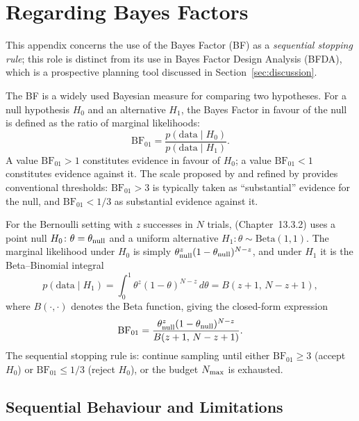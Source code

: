 \section{Regarding Bayes Factors}\label{app:app_bayes_factors}

This appendix concerns the use of the Bayes Factor (BF) as a \textit{sequential
stopping rule}; this role is distinct from its use in Bayes Factor Design Analysis
(BFDA), which is a prospective planning tool discussed in Section~\ref{sec:discussion}.

The BF is a widely used Bayesian measure for comparing two hypotheses.
For a null hypothesis $H_0$ and an alternative $H_1$, the Bayes Factor in favour of
the null is defined as the ratio of marginal likelihoods:
\begin{equation}\label{eq:bf_definition}
  \mathrm{BF}_{01} = \frac{p(\mathrm{data} \mid H_0)}{p(\mathrm{data} \mid H_1)}.
\end{equation}
A value $\mathrm{BF}_{01} > 1$ constitutes evidence in favour of $H_0$; a value
$\mathrm{BF}_{01} < 1$ constitutes evidence against it.
The scale proposed by \citet{jeffreys1961} and refined by \citet{kassraftery1995}
provides conventional thresholds: $\mathrm{BF}_{01} > 3$ is typically taken as
``substantial'' evidence for the null, and $\mathrm{BF}_{01} < 1/3$ as substantial
evidence against it.

For the Bernoulli setting with $z$ successes in $N$ trials, \citet{kruschke2015doing}
(Chapter~13.3.2) uses a point null $H_0\colon \theta = \theta_{\rm null}$ and a uniform
alternative $H_1\colon \theta \sim \mathrm{Beta}(1, 1)$.  The marginal likelihood under
$H_0$ is simply $\theta_{\rm null}^{z}(1-\theta_{\rm null})^{N-z}$, and under $H_1$ it
is the Beta--Binomial integral
\begin{equation}\label{eq:bf_h1_marginal}
  p(\mathrm{data} \mid H_1)
  = \int_0^1 \theta^{z}(1-\theta)^{N-z}\,d\theta
  = B(z+1,\, N-z+1),
\end{equation}
where $B(\cdot,\cdot)$ denotes the Beta function, giving the closed-form expression
\begin{equation}\label{eq:bf_bernoulli}
  \mathrm{BF}_{01}
  = \frac{\theta_{\rm null}^{z}(1-\theta_{\rm null})^{N-z}}{B(z+1,\, N-z+1)}.
\end{equation}
The sequential stopping rule is: continue sampling until either
$\mathrm{BF}_{01} \geq 3$ (accept $H_0$) or $\mathrm{BF}_{01} \leq 1/3$ (reject $H_0$),
or the budget $N_{\rm max}$ is exhausted.

\subsection*{Sequential Behaviour and Limitations}

